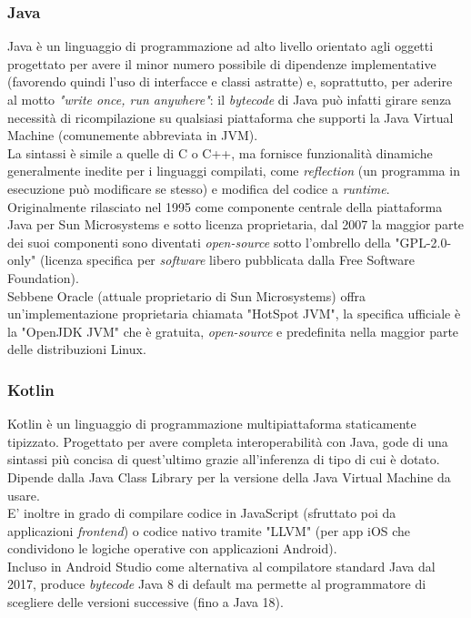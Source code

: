 \subsubsection{Java}
Java è un linguaggio di programmazione ad alto livello orientato agli oggetti progettato per avere il minor numero possibile di dipendenze implementative (favorendo quindi l'uso di interfacce e classi astratte) e, soprattutto, per aderire al motto \textit{"write once, run anywhere"}: il \textit{bytecode} di Java può infatti girare senza necessità di ricompilazione su qualsiasi piattaforma che supporti la Java Virtual Machine (comunemente abbreviata in JVM).\\  
La sintassi è simile a quelle di C o C++, ma fornisce funzionalità dinamiche generalmente inedite per i linguaggi compilati, come \textit{reflection} (un programma in esecuzione può modificare se stesso) e modifica del codice a \textit{runtime}.\\
Originalmente rilasciato nel 1995 come componente centrale della piattaforma Java per Sun Microsystems e sotto licenza proprietaria, dal 2007 la maggior parte dei suoi componenti sono diventati \textit{open-source} sotto l'ombrello della "GPL-2.0-only" (licenza specifica per \textit{software} libero pubblicata dalla Free Software Foundation).\\
Sebbene Oracle (attuale proprietario di Sun Microsystems) offra un'implementazione proprietaria chiamata "HotSpot JVM", la specifica ufficiale è la "OpenJDK JVM" che è gratuita, \textit{open-source} e predefinita nella maggior parte delle distribuzioni Linux.

\subsubsection{Kotlin}
Kotlin è un linguaggio di programmazione multipiattaforma staticamente tipizzato. Progettato per avere completa interoperabilità con Java, gode di una sintassi più concisa di quest'ultimo grazie all'inferenza di tipo di cui è dotato. Dipende dalla Java Class Library per la versione della Java Virtual Machine da usare.\\
E' inoltre in grado di compilare codice in JavaScript (sfruttato poi da applicazioni \textit{frontend}) o codice nativo tramite "LLVM" (per app iOS che condividono le logiche operative con applicazioni Android).\\
Incluso in Android Studio come alternativa al compilatore standard Java dal 2017, produce \textit{bytecode} Java 8 di default ma permette al programmatore di scegliere delle versioni successive (fino a Java 18).

